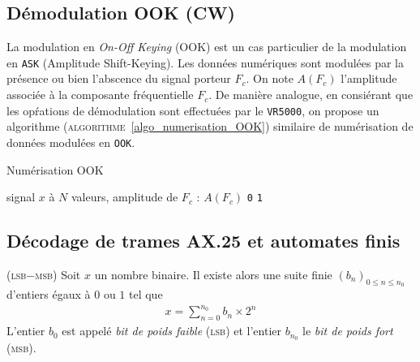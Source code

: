 \documentclass[twocolumn,pre,floats,aps,amsmath,amssymb]{revtex4}
\newenvironment{definition}[1][D\'efinition.]{\begin{trivlist}
\item[\hskip \labelsep {\bfseries #1}]}{\end{trivlist}}
\begin{document}

\subsection{D\'emodulation OOK (CW)}

La modulation en \textit{On-Off Keying} (OOK) est un cas particulier de la modulation en \texttt{ASK} (Amplitude Shift-Keying). Les donn\'ees num\'eriques sont modul\'ees par la pr\'esence ou bien l'abscence du signal porteur $F_c$. On note $A(F_c)$ l'amplitude associ\'ee \`a la composante fr\'equentielle $F_c$. De mani\`ere analogue, en consi\'erant que les op\'rations de d\'emodulation sont effectu\'ees par le \texttt{VR5000}, on propose un algorithme (\textsc{algorithme}~\ref{algo_numerisation_OOK}) similaire de num\'erisation de donn\'ees modul\'ees en \texttt{OOK}.

\begin{algorithm}[h]
\caption{Num\'erisation OOK}
\label{algo_numerisation_OOK}
\begin{algorithmic}[1]
  \REQUIRE signal $x$ \`a $N$ valeurs, amplitude de $F_c$ : $A(F_c)$
  \RETURN \texttt{0}
  \ELSE
  \RETURN \texttt{1}
  \ENDIF
\end{algorithmic}
\end{algorithm}

\subsection{D\'ecodage de trames AX.25 et automates finis}

\begin{definition}
  { \color{rltred}{\Radioactivity} }
  \textsc{(lsb$-$msb)}
  Soit $x$ un nombre binaire. Il existe alors une suite finie $\left ( b_n \right )_{0 \leq n \leq n_0}$ d'entiers \'egaux \`a $0$ ou $1$ tel que
  \begin{eqnarray*}
    x = \sum^{n_0}_{n = 0}{b_n \times 2^n}
  \end{eqnarray*}
  L'entier $b_0$ est appel\'e \textit{bit de poids faible} (\textsc{lsb}) et l'entier $b_{n_0}$ le \textit{bit de poids fort} (\textsc{msb}).
\end{definition}
\end{document}
